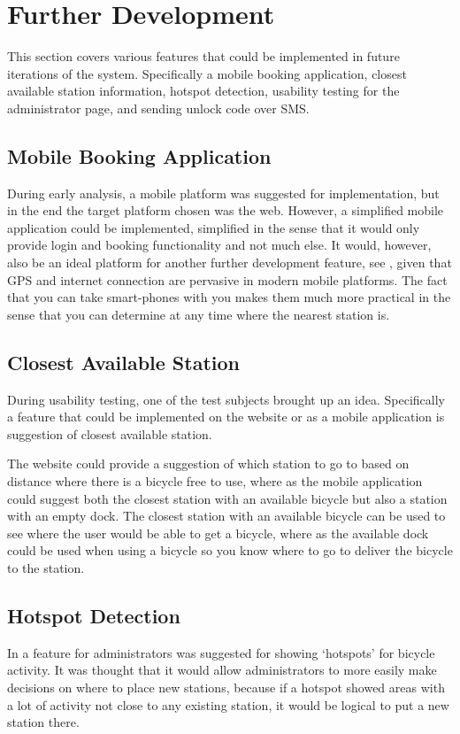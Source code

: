 \section{Further Development}\label{sec:furdev}
This section covers various features that could be implemented in future iterations of the system. Specifically a mobile booking application, closest available station information, hotspot detection, usability testing for the administrator page, and sending unlock code over SMS. 

\subsection{Mobile Booking Application}\label{sec:fd-mobileapp}
During early analysis, a mobile platform was suggested for implementation, but in the end the target platform chosen was the web. 
However, a simplified mobile application could be implemented, simplified in the sense that it would only provide login and booking functionality and not much else.
It would, however, also be an ideal platform for another further development feature, see , given that GPS and internet connection are pervasive in modern mobile platforms.
The fact that you can take smart-phones with you makes them much more practical in the sense that you can determine at any time where the nearest station is.

\subsection{Closest Available Station}\label{subsec:closeststation}
During usability testing, one of the test subjects brought up an idea.
Specifically a feature that could be implemented on the website or as a mobile application is suggestion of closest available station.

The website could provide a suggestion of which station to go to based on distance where there is a bicycle free to use, where as the mobile application could suggest both the closest station with an available bicycle but also a station with an empty dock.
The closest station with an available bicycle can be used to see where the user would be able to get a bicycle, where as the available dock could be used when using a bicycle so you know where to go to deliver the bicycle to the station.

\subsection{Hotspot Detection}
In  a feature for administrators was suggested for showing `hotspots' for bicycle activity. 
It was thought that it would allow administrators to more easily make decisions on where to place new stations, because if a hotspot showed areas with a lot of activity not close to any existing station, it would be logical to put a new station there.

